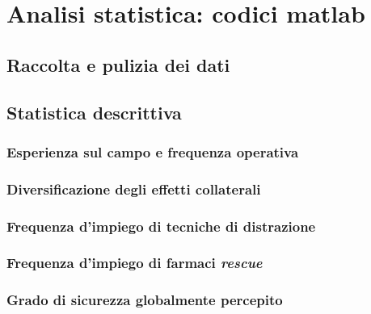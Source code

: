 \chapter{Analisi statistica: codici matlab}

\section{Raccolta e pulizia dei dati}
\label{code:wrangling}

    
    \newpage

\section{Statistica descrittiva}


    \subsection*{Esperienza sul campo e frequenza operativa}
    \label{code:seniority-vs-experience}
    
    \newpage
    
    \subsection*{Diversificazione degli effetti collaterali}
    \label{code:adverse-effects-incidence}
    
    \newpage

    \subsection*{Frequenza d'impiego di tecniche di distrazione}
    \label{code:misdirection-techniques}
    
    \newpage

    \subsection*{Frequenza d'impiego di farmaci \emph{rescue}}
    \label{code:rescue}
    
    \newpage

    \subsection*{Grado di sicurezza globalmente percepito}
    \label{code:safety}
    
    \newpage

